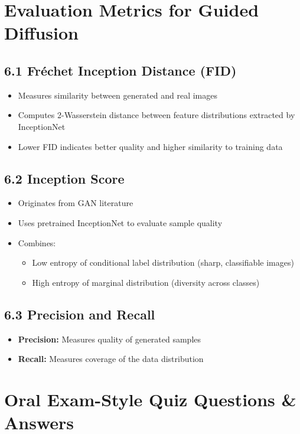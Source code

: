 \section{Evaluation Metrics for Guided Diffusion}

\subsection*{6.1 Fréchet Inception Distance (FID)}
\begin{itemize}
    \item Measures similarity between generated and real images
    \item Computes 2-Wasserstein distance between feature distributions extracted by InceptionNet
    \item Lower FID indicates better quality and higher similarity to training data
\end{itemize}

\subsection*{6.2 Inception Score}
\begin{itemize}
    \item Originates from GAN literature
    \item Uses pretrained InceptionNet to evaluate sample quality
    \item Combines:
    \begin{itemize}
        \item Low entropy of conditional label distribution (sharp, classifiable images)
        \item High entropy of marginal distribution (diversity across classes)
    \end{itemize}
\end{itemize}

\subsection*{6.3 Precision and Recall}
\begin{itemize}
    \item \textbf{Precision:} Measures quality of generated samples
    \item \textbf{Recall:} Measures coverage of the data distribution
\end{itemize}

\section{Oral Exam-Style Quiz Questions \& Answers}


